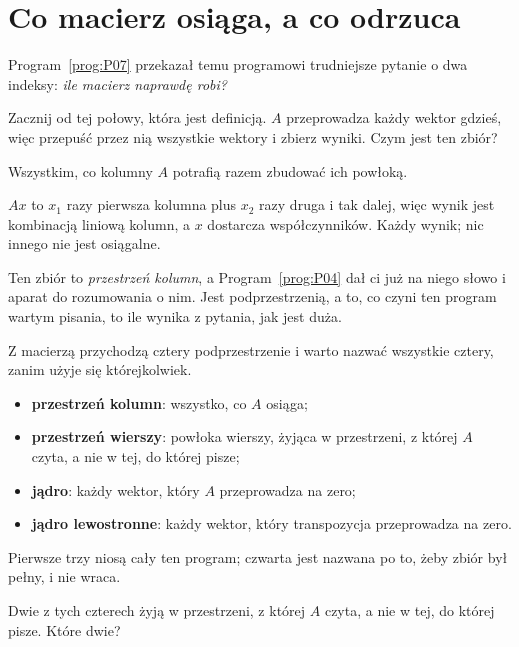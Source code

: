 \section{Co macierz osiąga, a co odrzuca}
\label{sec:P08-subspaces}

\begin{fr}
Program~\ref{prog:P07} przekazał temu programowi trudniejsze pytanie o dwa
indeksy: \emph{ile macierz naprawdę robi?}

Zacznij od tej połowy, która jest definicją. $A$ przeprowadza każdy wektor
gdzieś, więc przepuść przez nią wszystkie wektory i zbierz wyniki. Czym jest
ten zbiór?
\dotline
\nextframe
\end{fr}

\begin{fr}
\begin{ansblock}
Wszystkim, co kolumny $A$ potrafią razem zbudować \dash{} ich powłoką.
\end{ansblock}

$Ax$ to $x_1$ razy pierwsza kolumna plus $x_2$ razy druga i tak dalej, więc
wynik jest kombinacją liniową kolumn, a $x$ dostarcza współczynników. Każdy
wynik; nic innego nie jest osiągalne.

Ten zbiór to \emph{przestrzeń kolumn}, a Program~\ref{prog:P04} dał ci już na
niego słowo i aparat do rozumowania o nim. Jest podprzestrzenią, a to, co czyni
ten program wartym pisania, to ile wynika z pytania, jak jest duża.
\end{fr}

\begin{fr}
Z macierzą przychodzą cztery podprzestrzenie i warto nazwać wszystkie cztery,
zanim użyje się którejkolwiek.

\begin{itemize}
\item \textbf{przestrzeń kolumn}: wszystko, co $A$ osiąga;
\item \textbf{przestrzeń wierszy}: powłoka wierszy, żyjąca w przestrzeni, z
  której $A$ czyta, a nie w tej, do której pisze;
\item \textbf{jądro}: każdy wektor, który $A$ przeprowadza na zero;
\item \textbf{jądro lewostronne}: każdy wektor, który transpozycja przeprowadza
  na zero.
\end{itemize}

Pierwsze trzy niosą cały ten program; czwarta jest nazwana po to, żeby zbiór
był pełny, i nie wraca.

Dwie z tych czterech żyją w przestrzeni, z której $A$ czyta, a nie w tej, do
której pisze. Które dwie?
\dotline
\nextframe
\end{fr}

